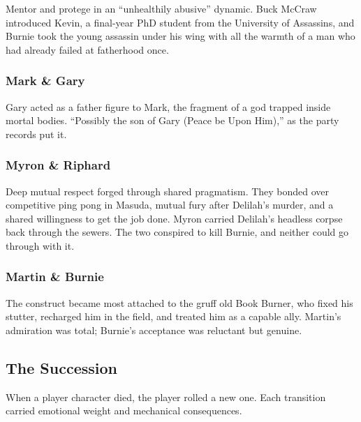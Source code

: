 Mentor and protege in an ``unhealthily abusive'' dynamic.  Buck McCraw introduced Kevin, a final-year PhD student from the University of Assassins, and Burnie took the young assassin under his wing with all the warmth of a man who had already failed at fatherhood once.

\subsubsection*{Mark \& Gary}

Gary acted as a father figure to Mark, the fragment of a god trapped inside mortal bodies.  ``Possibly the son of Gary (Peace be Upon Him),'' as the party records put it.

\subsubsection*{Myron \& Riphard}

Deep mutual respect forged through shared pragmatism.  They bonded over competitive ping pong in Masuda, mutual fury after Delilah's murder, and a shared willingness to get the job done.  Myron carried Delilah's headless corpse back through the sewers.  The two conspired to kill Burnie, and neither could go through with it.

\subsubsection*{Martin \& Burnie}

The construct became most attached to the gruff old Book Burner, who fixed his stutter, recharged him in the field, and treated him as a capable ally.  Martin's admiration was total; Burnie's acceptance was reluctant but genuine.

\subsection*{The Succession}

When a player character died, the player rolled a new one.  Each transition carried emotional weight and mechanical consequences.

